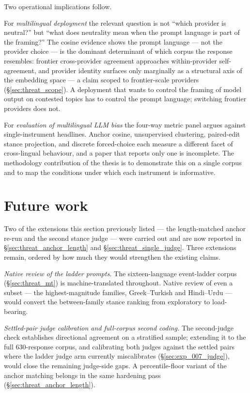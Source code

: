 Two operational implications follow.

For \emph{multilingual deployment} the relevant question is not
``which provider is neutral?'' but ``what does neutrality mean
when the prompt language is part of the framing?'' The cosine evidence shows
the prompt language --- not the
provider choice --- is the dominant determinant of which corpus
the response resembles: frontier cross-provider agreement approaches
within-provider self-agreement, and provider identity surfaces only
marginally as a structural axis of the embedding space --- a claim
scoped to frontier-scale providers
(\S\ref{sec:threat_scope}). A deployment that wants to
control the framing of model output on contested topics has to
control the prompt language; switching frontier providers does not.

For \emph{evaluation of multilingual LLM bias} the four-way metric
panel argues against single-instrument headlines. Anchor cosine,
unsupervised clustering, paired-edit stance projection, and discrete
forced-choice each measure a different facet of cross-lingual
behaviour, and a paper that reports only one is incomplete. The
methodology contribution of the thesis is to demonstrate this on a
single corpus and to map the conditions under which each instrument
is informative.

\section{Future work}\label{sec:future_work}

Two of the extensions this section previously listed --- the
length-matched anchor re-run and the second stance judge --- were
carried out and are now reported in
\S\ref{sec:threat_anchor_length} and
\S\ref{sec:threat_single_judge}. Three extensions remain, ordered
by how much they would strengthen the existing claims.

\emph{Native review of the ladder prompts.} The sixteen-language
event-ladder corpus (\S\ref{sec:threat_mt}) is machine-translated
throughout. Native review of even a subset --- the highest-magnitude
families, Greek--Turkish and Hindi--Urdu --- would convert the
between-family stance ranking from exploratory to load-bearing.

\emph{Settled-pair judge calibration and full-corpus second
coding.} The second-judge check establishes directional agreement
on a stratified sample; extending it to the full $630$-response
corpus, and calibrating both judges against the settled pairs where
the ladder judge arm currently miscalibrates
(\S\ref{sec:exp_007_judge}), would close the remaining judge-side
gaps. A percentile-floor variant of the anchor matching belongs in
the same hardening pass
(\S\ref{sec:threat_anchor_length}).

